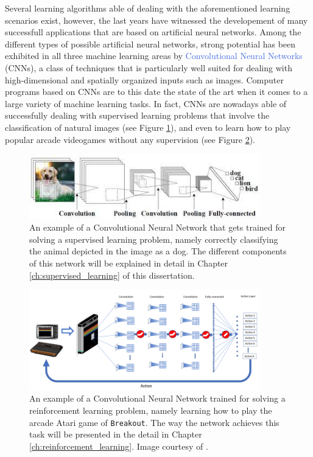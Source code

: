 Several learning algorithms able of dealing with the aforementioned learning scenarios exist, however, the last years have witnessed the developement of many successfull applications that are based on artificial neural networks. Among the different types of possible artificial neural networks, strong potential has been exhibited in all three machine learning areas by \textcolor{RoyalBlue}{Convolutional Neural Networks} (CNNs), a class of techniques that is particularly well suited for dealing with high-dimensional and spatially organized inputs such as images. Computer programs based on CNNs are to this date the state of the art when it comes to a large variety of machine learning tasks. In fact, CNNs are nowadays able of successfully dealing with supervised learning problems that involve the classification of natural images (see Figure \ref{fig:dogo}), and even to learn how to play popular arcade videogames without any supervision (see Figure \ref{fig:dqn_example}).

\begin{figure}[ht!]
\centering
  \includegraphics[width=10cm]{./Images/Chapter00/dogo}
  \caption{An example of a Convolutional Neural Network that gets trained for solving a supervised learning problem, namely correctly classifying the animal depicted in the image as a dog. The different components of this network will be explained in detail in Chapter \ref{ch:supervised_learning} of this dissertation.}
  \label{fig:dogo}
\end{figure}

\begin{figure}[ht!]
\centering
  \includegraphics[width=10cm]{./Images/Chapter00/dqn}
  \caption{An example of a Convolutional Neural Network trained for solving a reinforcement learning problem, namely learning how to play the arcade Atari game of \texttt{Breakout}. The way the network achieves this task will be presented in the detail in Chapter \ref{ch:reinforcement_learning}. Image courtesy of \citet{patel2019improved}.}
  \label{fig:dqn_example}
\end{figure}




